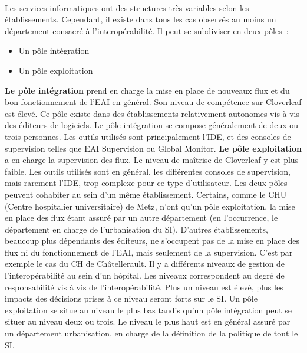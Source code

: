 			\paragraph{}%
			Les services informatiques ont des structures très variables selon les
			établissements. Cependant, il existe dans tous les cas observés au moins un
			département consacré à l’interopérabilité. Il peut se subdiviser
			en deux pôles~:
			\begin{itemize}
			  \item Un pôle intégration
			  \item Un pôle exploitation
			\end{itemize}
			\textbf{Le pôle intégration} prend en charge la mise en place de nouveaux
			flux et du bon fonctionnement de l’EAI en général. Son niveau de compétence sur
			Cloverleaf est élevé. Ce pôle existe dans des établissements
			relativement autonomes vis-à-vis des éditeurs de logiciels. Le pôle
			intégration se compose généralement de deux ou trois personnes. Les outils
			utilisés sont principalement l’IDE, et des consoles de supervision telles que EAI
			Supervision ou Global Monitor.\newline
			\textbf{Le pôle exploitation} a en charge la supervision des flux. Le niveau
			de maîtrise de Cloverleaf y est plus faible. Les outils utilisés sont en
			général, les différentes consoles de supervision,
			mais rarement l’IDE, trop complexe pour ce type d’utilisateur.\newline
			Les deux pôles peuvent cohabiter au sein d’un même établissement. Certains,
			comme le CHU (Centre hospitalier universitaire) de Metz, n’ont qu’un pôle
			exploitation, la mise en place des flux étant assuré par un autre département (en l’occurrence, le département
			en charge de l’urbanisation du SI). D’autres établissements, beaucoup plus
			dépendants des éditeurs, ne s’occupent pas de la mise en place des flux ni
			du fonctionnement de l’EAI, mais seulement de la supervision. C’est par
			exemple le cas du CH de Châtellerault.\newline
			Il y a différents niveaux de gestion de l’interopérabilité au sein d’un
			hôpital.
			Les niveaux correspondent au degré de responsabilité vis à vis de
			l'interopérabilité. Plus un niveau est élevé, plus les impacts des
			décisions prises à ce niveau seront forts sur le SI. Un pôle exploitation se
			situe au niveau le plus bas tandis qu’un pôle intégration peut se situer au
			niveau deux ou trois. Le niveau le plus haut est en général assuré par un
			département urbanisation, en charge de la définition de la politique de tout le SI.
			
